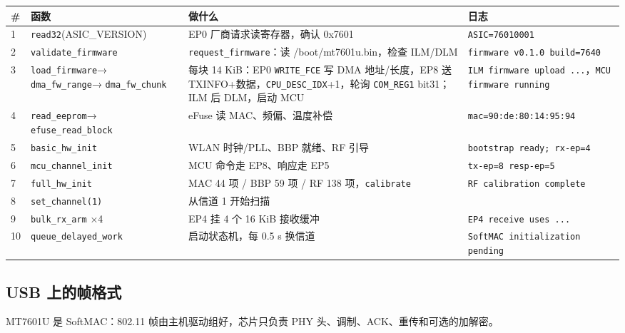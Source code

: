 \documentclass[UTF8,zihao=-4,fontset=none]{ctexart}
\newcommand{\fn}[1]{\texttt{#1}}
\begin{document}
\begin{longtable}{p{4mm}p{40mm}p{60mm}p{42mm}}
\toprule
\# & 函数 & 做什么 & 日志 \\ \midrule \endhead
1 & \fn{read32}\newline (ASIC\_VERSION) & EP0 厂商请求读寄存器，确认 0x7601 & \fn{ASIC=76010001} \\
2 & \fn{validate\_firmware} & \fn{request\_firmware}：读 /boot/mt7601u.bin，检查 ILM/DLM & \fn{firmware v0.1.0 build=7640} \\
3 & \fn{load\_firmware}\newline → \fn{dma\_fw\_range}\newline → \fn{dma\_fw\_chunk} & 每块 14 KiB：EP0 \fn{WRITE\_FCE} 写 DMA 地址/长度，EP8 送 TXINFO+数据，\fn{CPU\_DESC\_IDX}+1，轮询 \fn{COM\_REG1} bit31；ILM 后 DLM，启动 MCU & \fn{ILM firmware upload ...}，\fn{MCU firmware running} \\
4 & \fn{read\_eeprom}\newline → \fn{efuse\_read\_block} & eFuse 读 MAC、频偏、温度补偿 & \fn{mac=90:de:80:}\newline\fn{14:95:94} \\
5 & \fn{basic\_hw\_init} & WLAN 时钟/PLL、BBP 就绪、RF 引导 & \fn{bootstrap ready; rx-ep=4} \\
6 & \fn{mcu\_channel\_init} & MCU 命令走 EP8、响应走 EP5 & \fn{tx-ep=8 resp-ep=5} \\
7 & \fn{full\_hw\_init} & MAC 44 项 / BBP 59 项 / RF 138 项，\fn{calibrate} & \fn{RF calibration complete} \\
8 & \fn{set\_channel(1)} & 从信道 1 开始扫描 & \\
9 & \fn{bulk\_rx\_arm} ×4 & EP4 挂 4 个 16 KiB 接收缓冲 & \fn{EP4 receive uses ...} \\
10 & \fn{queue\_delayed\_work} & 启动状态机，每 0.5 s 换信道 & \fn{SoftMAC initialization pending} \\
\bottomrule
\end{longtable}

\subsection{USB 上的帧格式}

MT7601U 是 SoftMAC：802.11 帧由主机驱动组好，芯片只负责 PHY 头、调制、ACK、重传和可选的加解密。
\end{document}
